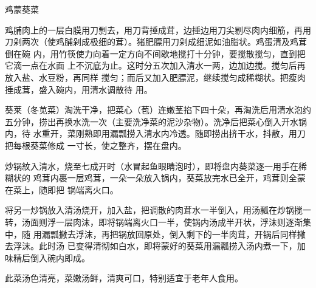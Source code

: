 \begin{recipe}{鸡蒙葵菜}

\ingredients


\preparation

\step 鸡脯肉上的一层白膜用刀剽去，用刀背捶成茸，边捶边用刀尖剔尽肉内细筋，再用
刀剁两次（使鸡脯剁成极细的茸）。猪肥膘用刀剁成细泥如油脂状。鸡蛋清及鸡茸倒在碗
内，用竹筷使力向着一定方向不间歇地搅打十分钟，要搅散搅匀，直到把它滴一点在水面
上不沉底为止。这时分五次加入清水一两，边加边搅。搅匀后再放入盐、水豆粉，再同样
搅匀；而后又加入肥膘泥，继续搅匀成稀糊状。把瘦肉捶成茸，盛入碗内，用清水调散待
用。

\step 葵莱（冬苋菜）淘洗干净，把菜心（苞）连嫩茎掐下四十朵，再淘洗后用清水泡约
五分钟，捞出再换水洗一次（主要洗净菜的泥沙杂物）。洗净后把菜心倒入开水锅内，待
水重开，菜刚熟即用漏瓢捞入清水内冷透。随即捞出挤干水，抖散，用刀把每根葵菜修成
一寸长，使之整齐，摆在盘内。

炒锅紋入清水，烧至七成开时（水冒起鱼眼睛泡时），即将盘内葵菜逐一用手在稀糊状的
鸡茸内裹一层鸡茸，一朵一朵放入锅内，葵菜放完水已全开，鸡茸则全蒙在菜上，随即把
锅端离火口。

\step 将另一炒锅放入清汤烧开，加入盐，把调散的肉茸水一半倒入，用汤瓢在炒锅搅一
转，汤面则浮一层肉沫，即将锅端离火口一半，使锅内汤成半开状，浮沬则逐渐集中，随
用漏瓢撇去浮沫，再把锅放回原处，倒入剩下的一半肉茸，开锅后同样撇去浮沫。此时汤
已变得清彻如白水，即将蒙好的葵菜用漏瓢捞入汤内煮一下，加味精后倒入碗内即成。

\features

此菜汤色清亮，菜嫩汤鲜，清爽可口，特别适宜于老年人食用。

\end{recipe}

